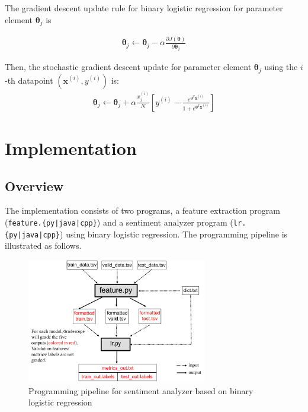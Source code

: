 \documentclass[11pt,addpoints,answers]{exam}
\newcommand{\xv}{\mathbf{x}}
\newcommand{\thetav     }{\boldsymbol \theta     }
\begin{document}
The gradient descent update rule  for binary logistic regression for parameter element $\thetav_j$ is

\begin{align}
    \thetav_j \leftarrow \thetav_j - \alpha \frac{\partial J(\thetav)}{\partial \thetav_j}
\end{align}


Then, the stochastic gradient descent update for  parameter element $\thetav_j$ using the $i$-th datapoint $(\xv^{(i)},y^{(i)})$ is:
\begin{align}
    \thetav_j \leftarrow \thetav_j + \alpha \frac{x_j^{\left(i\right)}}{N} \left[y^{(i)}-\frac{e^{\thetav^T\xv^{\left(i\right)}}}{1+e^{\thetav^T\xv^{\left(i\right)}}}\right]
\end{align}
 


\section{Implementation}

\subsection{Overview}\label{overview}

The implementation consists of two programs, a feature extraction program (\texttt{feature.\{py|java|cpp\}}) and a sentiment analyzer program (\texttt{lr.\{py|java|cpp\}}) using binary logistic regression. The programming pipeline is illustrated as follows.

\begin{figure}[H]
        \centering
        \includegraphics[width = 0.7\textwidth]{Pipeline.png}
        \caption{Programming pipeline for sentiment analyzer based on binary logistic regression}
        \label{pipeline}
\end{figure}
\end{document}
